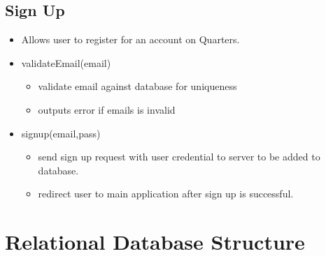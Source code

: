 \documentclass[12pt]{article}
\begin{document}
\subsection{Sign Up}

\begin{itemize}
    \item Allows user to register for an account on Quarters.
\end{itemize}
\begin{itemize}
    \item validateEmail(email)
    \begin{itemize}
        \item validate email against database for uniqueness
        \item outputs error if emails is invalid
    \end{itemize}
    \item signup(email,pass)
    \begin{itemize}
        \item send sign up request with user credential to server to be added to database.
        \item redirect user to main application after sign up is successful.
    \end{itemize}
\end{itemize}


\section{Relational Database Structure}
\end{document}
